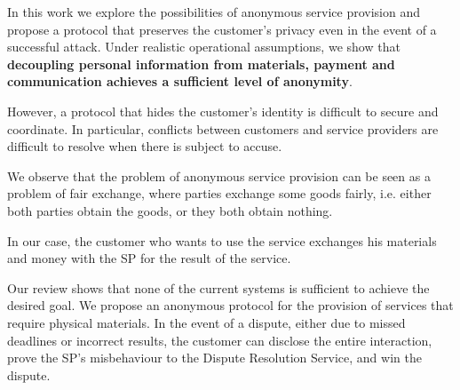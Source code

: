 \documentclass[pdftex,twocolumn,epjc3]{svjour3}
\begin{document}
\begin{sloppypar}
In this work we explore the possibilities of anonymous service provision and propose a protocol that preserves the customer's privacy even in the event of a successful attack. Under realistic operational assumptions, we show that \textbf{decoupling personal information from materials, payment and communication achieves a sufficient level of anonymity}.
\end{sloppypar}

However, a protocol that hides the customer's identity is difficult to secure and coordinate. In particular, conflicts between customers and service providers are difficult to resolve when there is subject to accuse.

We observe that the problem of anonymous service provision can be seen as a problem of fair exchange, where parties exchange some goods fairly, i.e. either both parties obtain the goods, or they both obtain nothing.

In our case, the customer who wants to use the service exchanges his materials and money with the SP for the result of the service.

\begin{sloppypar}
Our review shows that none of the current systems is sufficient to achieve the desired goal. We propose an anonymous protocol for the provision of services that require physical materials. In the event of a dispute, either due to missed deadlines or incorrect results, the customer can disclose the entire interaction, prove the SP's misbehaviour to the Dispute Resolution Service, and win the dispute.
\end{sloppypar}
\end{document}
